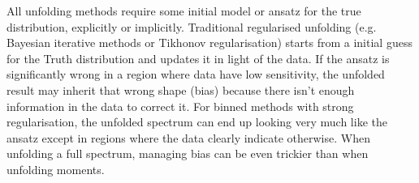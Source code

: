         All unfolding methods require some initial model or ansatz for the true distribution, explicitly or implicitly.
        Traditional regularised unfolding (e.g. Bayesian iterative methods or Tikhonov regularisation) starts from a initial guess for the Truth distribution and updates it in light of the data.
        If the ansatz is significantly wrong in a region where data have low sensitivity, the unfolded result may inherit that wrong shape (bias) because there isn't enough information in the data to correct it.
        For binned methods with strong regularisation, the unfolded spectrum can end up looking very much like the ansatz except in regions where the data clearly indicate otherwise.
        When unfolding a full spectrum, managing bias can be even trickier than when unfolding moments.
        
